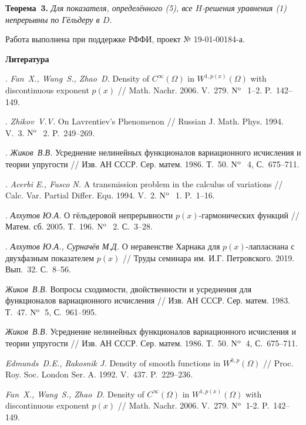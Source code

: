 \textbf{Теорема~3.} {\it Для показателя, определённого (5), все $H$-решения уравнения (1) непрерывны по Гёльдеру в $D$.}

\bigskip

Работа выполнена при поддержке РФФИ, проект № 19-01-00184-а.




\smallskip \centerline {\bf Литература} \nopagebreak

. {\it Fan~X., Wang~S., Zhao~D.} Density of $C^\infty(\Omega)$ in $W^{1,p(x)}(\Omega)$ with discontinuous exponent $p(x)$ // Math. Nachr. 2006. V.~279. ${\rm N^o}$\,~1--2. P.~142--149.

.  {\it Zhikov~V.V.} On Lavrentiev's Phenomenon // Russian J. Math. Phys. 1994. V.~3.  ${\rm N^o}$\,~2. P.~249--269.


. {\it Жиков~В.В.} Усреднение нелинейных функционалов вариационного исчисления и теории упругости // Изв. АН СССР.
Сер. матем. 1986. Т.~50. ${\rm N^o}$\,~4, С.~675--711.

. {\it Acerbi E., Fusco N.} A transmission problem in the calculus of variations // Calc. Var. Partial Differ. Equ. 1994. V.~2.  ${\rm N^o}$\,~1. P.~1--16.

. {\it Алхутов Ю.А.} О гёльдеровой непрерывности $p(x)$-гар\-мо\-ни\-ческих функций // Матем. сб. 2005. Т.~196. ${\rm N^o}$\,~2. С.~3--28. 

. {\it Алхутов Ю.А., Сурначёв М.Д.} О неравенстве Харнака для $p(x)$-лапласиана с двухфазным показателем $p(x)$ // Труды семинара им. И.Г. Петровского. 2019. Вып.~32. С.~8--56.


\iffalse
{} \emph{Жиков~В.В.} Вопросы сходимости, двойственности и усреднения для функционалов вариационного исчисления // Изв. АН
СССР. Сер. матем. 1983. Т.~47. ${\rm N^o}$\, 5, С.~961--995.

 \emph{Жиков~В.В.} Усреднение нелинейных функционалов вариационного исчисления и теории упругости // Изв. АН СССР.
Сер. матем. 1986. Т.~50. ${\rm N^o}$\, 4, С.~675--711.

 \emph{Edmunds~D.E., Rakosnik J.} Density of smooth functions in $W^{k,p}(\Omega)$ // Proc. Roy. Soc. London Ser. A. 1992. V.~437. P.~229--236.

 \emph{Fan~X., Wang~S., Zhao~D.} Density of $C^\infty(\Omega)$ in $W^{1,p(x)}(\Omega)$ with discontinuous exponent $p(x)$ // Math. Nachr. 2006. V.~279. ${\rm N^o}$\, 1-2. P.~142--149.


